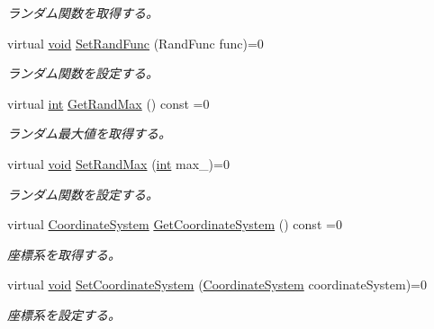 \begin{DoxyCompactItemize}
\begin{DoxyCompactList}\small\item\em ランダム関数を取得する。 \end{DoxyCompactList}\item 
virtual \mbox{\hyperlink{namespace_effekseer_ab34c4088e512200cf4c2716f168deb56}{void}} \mbox{\hyperlink{class_effekseer_1_1_manager_acff5857772ae9674b6f96ffd4de28f69}{Set\+Rand\+Func}} (Rand\+Func func)=0
\begin{DoxyCompactList}\small\item\em ランダム関数を設定する。 \end{DoxyCompactList}\item 
virtual \mbox{\hyperlink{namespace_effekseer_ace0abf7c2e6947e519ebe8b54cbcc30a}{int}} \mbox{\hyperlink{class_effekseer_1_1_manager_a2ae8c1ff28fedf995f65a3a6c83d840a}{Get\+Rand\+Max}} () const =0
\begin{DoxyCompactList}\small\item\em ランダム最大値を取得する。 \end{DoxyCompactList}\item 
virtual \mbox{\hyperlink{namespace_effekseer_ab34c4088e512200cf4c2716f168deb56}{void}} \mbox{\hyperlink{class_effekseer_1_1_manager_ad2e4e1458d5e1091f5cb8073ae8e60eb}{Set\+Rand\+Max}} (\mbox{\hyperlink{namespace_effekseer_ace0abf7c2e6947e519ebe8b54cbcc30a}{int}} max\+\_\+)=0
\begin{DoxyCompactList}\small\item\em ランダム関数を設定する。 \end{DoxyCompactList}\item 
virtual \mbox{\hyperlink{namespace_effekseer_ac8508f8823c5fcf36aac5d2ddee23765}{Coordinate\+System}} \mbox{\hyperlink{class_effekseer_1_1_manager_a10a79ead8392a39a9f43e771c7de067c}{Get\+Coordinate\+System}} () const =0
\begin{DoxyCompactList}\small\item\em 座標系を取得する。 \end{DoxyCompactList}\item 
virtual \mbox{\hyperlink{namespace_effekseer_ab34c4088e512200cf4c2716f168deb56}{void}} \mbox{\hyperlink{class_effekseer_1_1_manager_a804730036eada2d3e1883ed366c265cc}{Set\+Coordinate\+System}} (\mbox{\hyperlink{namespace_effekseer_ac8508f8823c5fcf36aac5d2ddee23765}{Coordinate\+System}} coordinate\+System)=0
\begin{DoxyCompactList}\small\item\em 座標系を設定する。 \end{DoxyCompactList}\item 

\end{DoxyCompactItemize}
